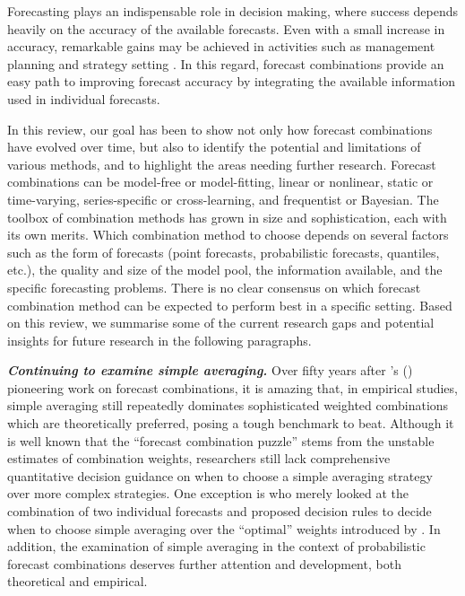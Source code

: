 \documentclass[a4paper,11pt]{article}
\def\citeapos#1{\citeauthor{#1}'s (\citeyear{#1})}
\begin{document}
Forecasting plays an indispensable role in decision making, where success depends heavily on the accuracy of the available forecasts. Even with a small increase in accuracy, remarkable gains may be achieved in activities such as management planning and strategy setting \citep{Makridakis1996-cf,Syntetos2009-ho}. In this regard, forecast combinations provide an easy path to improving forecast accuracy by integrating the available information used in individual forecasts.

In this review, our goal has been to show not only how forecast combinations have evolved over time, but also to identify the potential and limitations of various methods, and to highlight the areas needing further research. Forecast combinations can be model-free or model-fitting, linear or nonlinear, static or time-varying, series-specific or cross-learning, and frequentist or Bayesian. The toolbox of combination methods has grown in size and sophistication, each with its own merits. Which combination method to choose depends on several factors such as the form of forecasts (point forecasts, probabilistic forecasts, quantiles, etc.), the quality and size of the model pool, the information available, and the specific forecasting problems. There is no clear consensus on which forecast combination method can be expected to perform best in a specific setting. Based on this review, we summarise some of the current research gaps and potential insights for future research in the following paragraphs.

\textbf{\textit{Continuing to examine simple averaging.}} Over fifty years after \citeapos{Bates1969-yj} pioneering work on forecast combinations, it is amazing that, in empirical studies, simple averaging still repeatedly dominates sophisticated weighted combinations which are theoretically preferred, posing a tough benchmark to beat. Although it is well known that the ``forecast combination puzzle'' stems from the unstable estimates of combination weights, researchers still lack comprehensive quantitative decision guidance on when to choose a simple averaging strategy over more complex strategies. One exception is \citet{Blanc2016-sn} who merely looked at the combination of two individual forecasts and proposed decision rules to decide when to choose simple averaging over the ``optimal'' weights introduced by \citet{Bates1969-yj}. In addition, the examination of simple averaging in the context of probabilistic forecast combinations deserves further attention and development, both theoretical and empirical.
\end{document}
